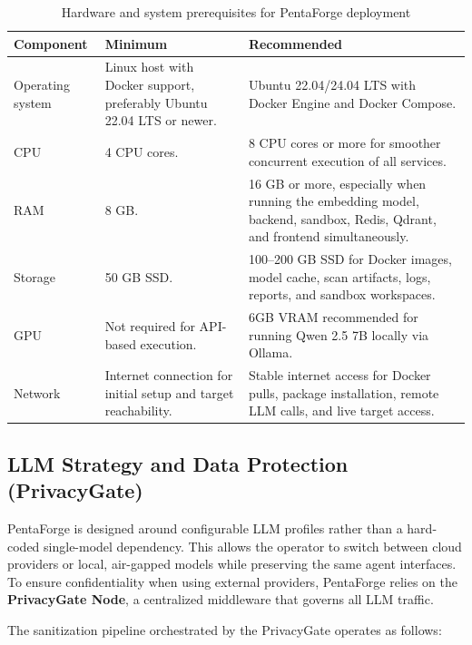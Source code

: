 \documentclass[12pt,a4paper]{report}
\begin{document}
\begin{table}[H]
    \centering
    \renewcommand{\arraystretch}{1.35}
    \begin{tabular}{|p{}|p{}|p{}|}
        \hline
        \textbf{Component} & \textbf{Minimum} & \textbf{Recommended} \\
        \hline
        Operating system & Linux host with Docker support, preferably Ubuntu 22.04
        LTS or newer. & Ubuntu 22.04/24.04 LTS with Docker Engine and Docker
        Compose. \\
        \hline
        CPU & 4 CPU cores. & 8 CPU cores or more for smoother concurrent execution
        of all services. \\
        \hline
        RAM & 8 GB. & 16 GB or more, especially when running the embedding model,
        backend, sandbox, Redis, Qdrant, and frontend simultaneously. \\
        \hline
        Storage & 50 GB SSD. & 100--200 GB SSD for Docker images, model cache,
        scan artifacts, logs, reports, and sandbox workspaces. \\
        \hline
        GPU & Not required for API-based execution. & 6GB VRAM recommended for
        running Qwen 2.5 7B locally via Ollama. \\
        \hline
        Network & Internet connection for initial setup and target reachability. &
        Stable internet access for Docker pulls, package installation, remote LLM
        calls, and live target access. \\
        \hline
    \end{tabular}
    \caption{Hardware and system prerequisites for PentaForge deployment}
    \label{tab:hardware_prerequisites}
\end{table}

\subsection{LLM Strategy and Data Protection (PrivacyGate)}

PentaForge is designed around configurable LLM profiles rather than a hard-coded
single-model dependency. This allows the operator to switch between cloud providers
or local, air-gapped models while preserving the same agent interfaces. To ensure
confidentiality when using external providers, PentaForge relies on the
\textbf{PrivacyGate Node}, a centralized middleware that governs all LLM traffic.

The sanitization pipeline orchestrated by the PrivacyGate operates as follows:
\end{document}
